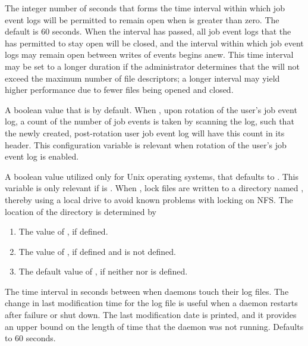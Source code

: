 \begin{description}
\label{param:UserlogFileCacheClearInterval}
\item[\Macro{USERLOG\_FILE\_CACHE\_CLEAR\_INTERVAL}]
  The integer number of seconds that forms the time interval within which
  job event logs will be permitted to remain open
  when  is greater than zero.
  The default is 60 seconds.
  When the interval has passed, 
  all job event logs that the  has permitted to stay
  open will be closed, and the interval within which 
  job event logs may remain open between writes of events begins anew.
  This time interval may be set to a longer duration
  if the administrator determines that the  will not
  exceed the maximum number of file descriptors;
  a longer interval may yield higher performance due to fewer files
  being opened and closed.

\label{param:EventLogCountEvents}
\item[\Macro{EVENT\_LOG\_COUNT\_EVENTS}]
  A boolean value that is  by default.
  When , upon rotation of the user's job event log, 
  a count of the number of job events is taken by scanning the log,
  such that the newly created,
  post-rotation user job event log will have this count in its header.
  This configuration variable is relevant when rotation of the
  user's job event log is enabled.

\label{param:NewLocking}
\item[\Macro{CREATE\_LOCKS\_ON\_LOCAL\_DISK}]
  A boolean value utilized only for Unix operating systems, 
  that defaults to . 
  This variable is only relevant if 
  is .
  When , lock files are written to a directory named ,
  thereby using a local drive to avoid known problems with locking on NFS.
  The location of the  directory is determined by
  \begin{enumerate}
  \item The value of , if defined.
  \item The value of , if defined and 
  is not defined.
  \item The default value of , if neither 
  nor  is defined.
  \end{enumerate}

\label{param:TouchLogInterval}
\item[\Macro{TOUCH\_LOG\_INTERVAL}]
  The time interval in seconds between when daemons touch
  their log files.  The change in last modification time for the
  log file is useful when a daemon restarts after failure or shut down.
  The last modification date is printed, and it provides an upper bound
  on the length of time that the daemon was not running.
  Defaults to 60 seconds.


\end{description}
